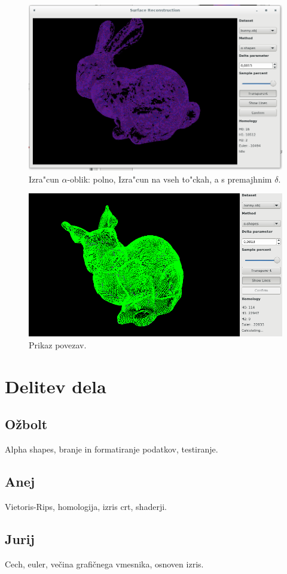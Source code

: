 \documentclass[11pt]{article}
\begin{document}
\begin{figure}[htb]
    \centering
    \includegraphics[width=1\textwidth]{alpha_lowdelta.png}
    \caption{Izra"cun $\alpha$-oblik: polno, Izra"cun na vseh to"ckah, a s premajhnim $\delta$.}
    \label{fig:a1}
\end{figure}

\begin{figure}[htb]
    \centering
    \includegraphics[width=\textwidth]{lines.png}
    \caption{Prikaz povezav.}
    \label{fig:edges}
\end{figure}


\section{Delitev dela}

\subsection{Ožbolt}
Alpha shapes, branje in formatiranje podatkov, testiranje. 

\subsection{Anej}
Vietoris-Rips, homologija, izris crt, shaderji.

\subsection{Jurij}
Cech, euler, večina grafičnega vmesnika, osnoven izris.

\newpage



\end{document}
